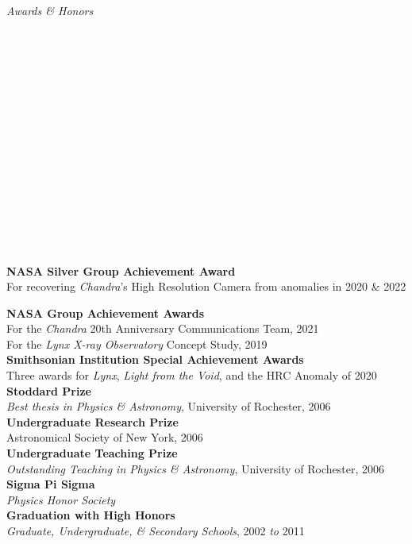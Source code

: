 \documentclass[11pt]{article}
\begin{document}
\vspace{4mm}

\hspace{2.5mm} \parbox{1.5in}{\textit{Awards \& Honors \\\\\\\\\\\\\\\\\\\\\\\\\\\\\\\\}} \parbox{5.15in}{
\textbf{NASA Silver Group Achievement Award}\\
For recovering \textit{Chandra}'s High Resolution Camera from anomalies in 2020 \& 2022

\textbf{NASA Group Achievement Awards} \\
For the \textit{Chandra} 20th Anniversary Communications Team, 2021\\
For the \textit{Lynx X-ray Observatory} Concept Study, 2019\\
\textbf{Smithsonian Institution Special Achievement Awards} \\ Three awards for \textit{Lynx}, \textit{Light from the Void}, and the HRC Anomaly of 2020\\
\textbf{Stoddard Prize} \\ \textit{Best thesis in Physics \& Astronomy}, University of Rochester, 2006 \\
\textbf{Undergraduate Research Prize} \\ Astronomical Society of New York, 2006 \\
\textbf{Undergraduate Teaching Prize} \\ \textit{Outstanding Teaching in Physics \& Astronomy}, University of Rochester, 2006\\
\textbf{Sigma Pi Sigma} \\ \textit{Physics Honor Society} \\
\textbf{Graduation with High Honors} \\ \textit{Graduate, Undergraduate, \& Secondary Schools}, 2002 \textit{to} 2011
} \\


\vspace{2mm}
\end{document}
